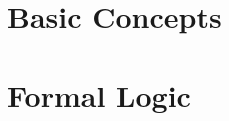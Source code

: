 \documentclass[openany, twoside]{book}
\begin{document}
\raggedright
\setlength{\parindent}{1em}
\setlength{\parskip}{1em}	

\frontmatter
\pagestyle{plain} %

	
{
\setlength{\parskip}{0em}

\renewcommand{\cftpartpresnum}{\sf\Large\partname\ }
\tableofcontents
}






\mainmatter
\setlength{\parindent}{1em}
\pagestyle{headings} %

\part{Basic Concepts} \label{part:basic_concepts}
%	
%

\part{Formal Logic} \label{part:formal_logic}
%
%
%
%	
%
%
%
%
%
\end{document}
